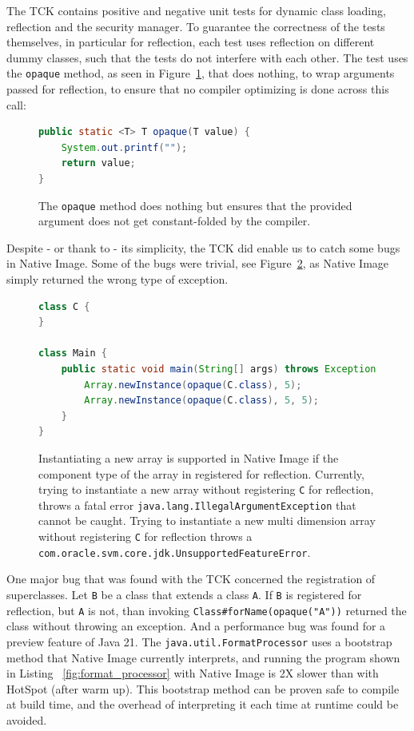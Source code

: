 The TCK contains positive and negative unit tests for dynamic class loading, reflection and the security manager. To guarantee the correctness of the tests themselves, in particular for reflection, each test uses reflection on different dummy classes, such that the tests do not interfere with each other.
The test uses the \verb|opaque| method, as seen in Figure~\ref{fig:opaque}, that does nothing, to wrap arguments passed for reflection, to ensure that no compiler optimizing is done across this call:
\begin{figure}[ht]
    \centering
\begin{lstlisting}[language=Java]
public static <T> T opaque(T value) {
    System.out.printf("");
    return value;
}
\end{lstlisting}
    \caption{The \texttt{opaque} method does nothing but ensures that the provided argument does not get constant-folded by the compiler.}
    \label{fig:opaque}
\end{figure}

Despite - or thank to - its simplicity, the TCK did enable us to catch some bugs in Native Image.
Some of the bugs were trivial, see Figure~\ref{fig:new_multi_array_bug}, as Native Image simply returned the wrong type of exception. 

\begin{figure}[ht]
    \centering
\begin{lstlisting}[language=Java]
class C {
}

class Main {
    public static void main(String[] args) throws Exception {
        Array.newInstance(opaque(C.class), 5);
        Array.newInstance(opaque(C.class), 5, 5);
    }
}
\end{lstlisting}
    \caption{Instantiating a new array is supported in Native Image if the component type of the array in registered for reflection. Currently, trying to instantiate a new array without registering \texttt{C} for reflection, throws a fatal error \texttt{java.lang.IllegalArgumentException} that cannot be caught. Trying to instantiate a new multi dimension array without registering \texttt{C} for reflection throws a \texttt{com.oracle.svm.core.jdk.UnsupportedFeatureError}.}
    \label{fig:new_multi_array_bug}
\end{figure}

One major bug that was found with the TCK concerned the registration of superclasses. Let \verb|B| be a class that extends a class \verb|A|. If \verb|B| is registered for reflection, but \verb|A| is not, than invoking \verb|Class#forName(opaque("A"))| returned the class without throwing an exception.
And a performance bug was found for a preview feature of Java 21. The \verb|java.util.FormatProcessor| uses a bootstrap method that Native Image currently interprets, and running the program shown in Listing ~\ref{fig:format_processor} with Native Image is 2X slower than with HotSpot (after warm up). This bootstrap method can be proven safe to compile at build time, and the overhead of interpreting it each time at runtime could be avoided.

